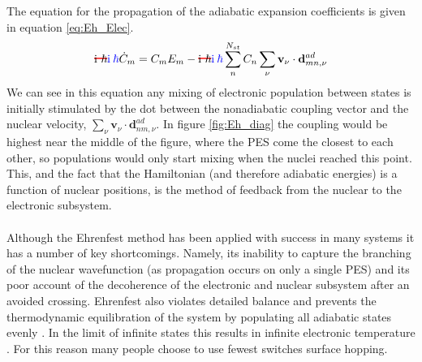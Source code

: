 \\\\
The equation for the propagation of the adiabatic expansion coefficients is given in equation \eqref{eq:Eh_Elec}.
\begin{equation}
	\mremove{\im \ \hbar}\madd{\im \: \hbar} \dot{C}_{m} = C_{m}E_{m} -  \mremove{\im \ \hbar}\madd{\im \: \hbar}  \sum_{n}^{N_{st}} C_{n} \sum_{\nu} \mathbf{v}_{\nu} \cdot \mathbf{d}^{ad}_{mn, \nu}
  \label{eq:Eh_Elec}
\end{equation}
We can see in this equation any mixing of electronic population between states is initially stimulated by the dot between the nonadiabatic coupling vector and the nuclear velocity, $\sum_{\nu} \mathbf{v}_{\nu} \cdot \mathbf{d}_{nm, \nu}^{ad}$. In figure \ref{fig:Eh_diag} the coupling would be highest near the middle of the figure, where the  PES come the closest to each other, so populations would only start mixing when the nuclei reached this point. This, and the fact that the Hamiltonian (and therefore adiabatic energies) is a function of nuclear positions, is the method of feedback from the nuclear to the electronic subsystem. 
\\\\
Although the Ehrenfest method has been applied with success in many systems \cite{Li2005Aug, Saita2012Dec, Kohen1998Sep} it has a number of key shortcomings. Namely, its inability to capture the branching of the nuclear wavefunction (as propagation occurs on only a single PES) and its poor account of the decoherence of the electronic and nuclear subsystem after an avoided crossing. Ehrenfest also violates detailed balance and prevents the thermodynamic equilibration of the system by populating all adiabatic states evenly \cite{tully_perspective:_2012, john_c._tully_nonadiabatic_nodate}. In the limit of infinite states this results in infinite electronic temperature \cite{parandekar_detailed_2006}. For this reason many people choose to use fewest switches surface hopping. 

